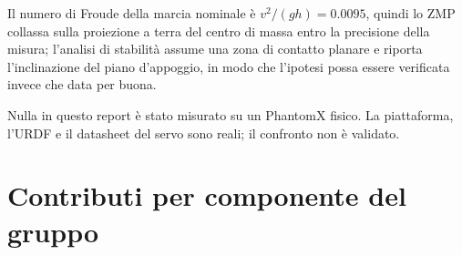 \documentclass[11pt,a4paper]{article}
\begin{document}
\begin{description}[style=unboxed,leftmargin=0pt,font=\normalfont\itshape]
\item[Solo stabilit\`a quasi-statica.] Il numero di Froude della marcia nominale
\`e $v^2/(gh) = 0.0095$, quindi lo ZMP collassa sulla proiezione a terra del
centro di massa entro la precisione della misura; l'analisi di stabilit\`a
assume una zona di contatto planare e riporta l'inclinazione del piano
d'appoggio, in modo che l'ipotesi possa essere verificata invece che data per
buona.

\item[Nessun hardware.] Nulla in questo report \`e stato misurato su un PhantomX
fisico. La piattaforma, l'URDF e il datasheet del servo sono reali; il
confronto non \`e validato.

\end{description}

\section{Contributi per componente del gruppo}
\label{sec:contributions}

\noindent{}

\vspace{6pt}
\end{document}
